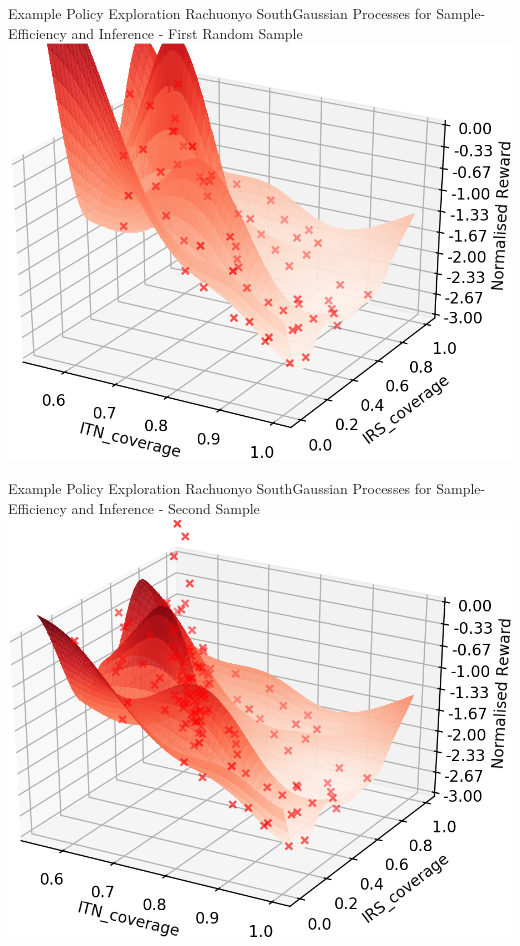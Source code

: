 \documentclass{beamer}
\begin{document}
\begin{frame}{Example Policy Exploration Rachuonyo South}{Gaussian Processes for Sample-Efficiency and Inference - First Random Sample}
\centering
\includegraphics[width=1\textheight]{images/Batch_1.png}
\end{frame}
\begin{frame}{Example Policy Exploration Rachuonyo South}{Gaussian Processes for Sample-Efficiency and Inference - Second Sample}
\centering
\includegraphics[width=1\textheight]{images/Batch_2.png}
\end{frame}
\end{document}
